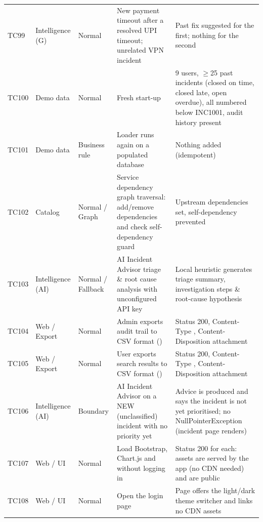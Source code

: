\begin{longtable}{@{}L{1.0cm}L{1.85cm}L{2.15cm}L{4.05cm}L{5.45cm}@{}}
TC99 & Intelligence (G) & Normal & New payment timeout after a resolved UPI timeout; unrelated VPN incident & Past fix suggested for the first; nothing for the second \\
TC100 & Demo data & Normal & Fresh start-up & 9 users, $\geq$25 past incidents (closed on time, closed late, open overdue), all numbered below INC1001, audit history present \\
TC101 & Demo data & Business rule & Loader runs again on a populated database & Nothing added (idempotent) \\
TC102 & Catalog & Normal / Graph & Service dependency graph traversal: add/remove dependencies and check self-dependency guard & Upstream dependencies set, self-dependency prevented \\
TC103 & Intelligence (AI) & Normal / Fallback & AI Incident Advisor triage \& root cause analysis with unconfigured API key & Local heuristic generates triage summary, investigation steps \& root-cause hypothesis \\
TC104 & Web / Export & Normal & Admin exports audit trail to CSV format () & Status 200, Content-Type , Content-Disposition attachment  \\
TC105 & Web / Export & Normal & User exports search results to CSV format () & Status 200, Content-Type , Content-Disposition attachment  \\
TC106 & Intelligence (AI) & Boundary & AI Incident Advisor on a NEW (unclassified) incident with no priority yet & Advice is produced and says the incident is not yet prioritised; no NullPointerException (incident page renders) \\
TC107 & Web / UI & Normal & Load Bootstrap, Chart.js and  without logging in & Status 200 for each: assets are served by the app (no CDN needed) and are public \\
TC108 & Web / UI & Normal & Open the login page & Page offers the light/dark theme switcher and links no CDN assets \\
\bottomrule
\end{longtable}
